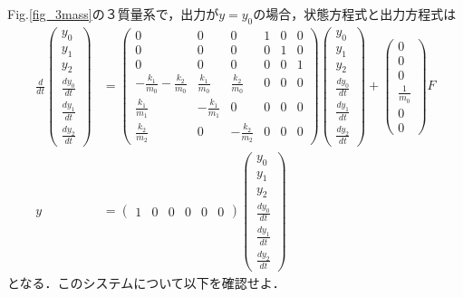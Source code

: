 Fig.\ref{fig_3mass}の３質量系で，出力が$y=y_0$の場合，状態方程式と出力方程式は
\begin{align}
 \frac{d}{dt} \left(\begin{array}{c}
	         y_0 \\
		     y_1 \\
		     y_2 \\
		     \frac{dy_0}{dt} \\
		     \frac{dy_1}{dt} \\
		     \frac{dy_2}{dt}
		    \end{array}\right)
 &=
 \left(\begin{array}{cccccc}
        0 & 0 & 0 & 1 & 0 & 0      \\
        0 & 0 & 0 & 0 & 1 & 0      \\
        0 & 0 & 0 & 0 & 0 & 1      \\
	-\frac{k_1}{m_0} -\frac{k_2}{m_0}&  \frac{k_1}{m_0} &  \frac{k_2}{m_0} & 0 & 0 & 0 \\
	 \frac{k_1}{m_1}                & -\frac{k_1}{m_1} &  0               & 0 & 0 & 0 \\
	 \frac{k_2}{m_2}                &  0               & -\frac{k_2}{m_2} & 0 & 0 & 0 
       \end{array}\right)
 \left(\begin{array}{c}
	         y_0 \\
		     y_1 \\
		     y_2 \\
		     \frac{dy_0}{dt} \\
		     \frac{dy_1}{dt} \\
		     \frac{dy_2}{dt}
       \end{array}\right)
 +
 \left(\begin{array}{c}
        0 \\
        0 \\
        0 \\
	    \frac{1}{m_0} \\
	    0 \\
	    0 
       \end{array}\right)
        F
\nonumber
\\
y &=
 \left(\begin{array}{cccccc}
         1 & 0 & 0 & 0 & 0 & 0
       \end{array}\right)
 \left(\begin{array}{c}
	         y_0 \\
		     y_1 \\
		     y_2 \\
		     \frac{dy_0}{dt} \\
		     \frac{dy_1}{dt} \\
		     \frac{dy_2}{dt}
       \end{array}\right)
\nonumber
\end{align}
となる．このシステムについて以下を確認せよ．

